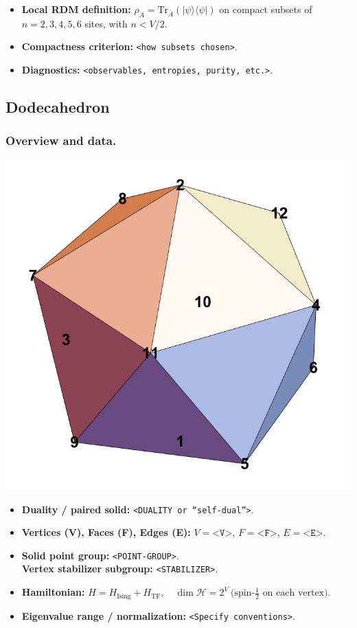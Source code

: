 \documentclass[11pt,a4paper]{article}
\newcommand{\Hising}{H_{\mathrm{Ising}}}
\newcommand{\Htf}{H_{\mathrm{TF}}}
\newcommand{\Htot}{H=\Hising+\Htf}
\begin{document}
\begin{itemize}[leftmargin=1.5em]
  \item \textbf{Local RDM definition:} $\rho_A=\mathrm{Tr}_{\bar A}(|\psi\rangle\langle\psi|)$ on compact subsets of $n=2,3,4,5,6$ sites, with $n < V/2$.
  \item \textbf{Compactness criterion:} \texttt{<how subsets chosen>}.
  \item \textbf{Diagnostics:} \texttt{<observables, entropies, purity, etc.>}.
\end{itemize}


\subsection*{Dodecahedron}

\subsubsection*{Overview and data.}
\begin{center}
  \includegraphics[width=.6\linewidth]{icosahedron}
\end{center}

\begin{itemize}[leftmargin=1.5em]
  \item \textbf{Duality / paired solid:} \texttt{<DUALITY or “self-dual”>}.
  \item \textbf{Vertices (V), Faces (F), Edges (E):} $V=\texttt{<V>}$,\; $F=\texttt{<F>}$,\; $E=\texttt{<E>}$.
  \item \textbf{Solid point group:} \texttt{<POINT-GROUP>}.\\
        \textbf{Vertex stabilizer subgroup:} \texttt{<STABILIZER>}.
  \item \textbf{Hamiltonian:} \(
        \Htot,\quad
        \dim\mathcal{H} = 2^{V}\ \text{(spin-$\tfrac12$ on each vertex).}
        \)
  \item \textbf{Eigenvalue range / normalization:} \texttt{<Specify conventions>}.
\end{itemize}
\end{document}
